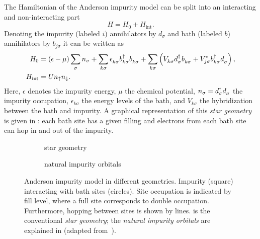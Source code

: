 The Hamiltonian of the Anderson impurity model \cite{Anderson1961} can be split into
an interacting and non-interacting part
\begin{equation}
    H = H_0 + H_\mathrm{int}.
    \label{eq:impurity-Hamiltonian}
\end{equation}
Denoting the impurity (labeled $i$) annihilators by $d_\sigma$
and bath (labeled $b$) annihilators by $b_{j\sigma}$
it can be written as
\begin{align}
    H_0
     & =
    (\epsilon - \mu) \sum_{\pk\sigma} n_\sigma
    +
    \sum_{k\sigma} \epsilon_{k\sigma}^{\pdag} b^\dag_{k\sigma} b^{\pdag}_{k\sigma}
    +
    \sum_{k\sigma} \left(V^{\ps}_{k\sigma} d^\dag_{\pk\sigma} b^{\pdag}_{k\sigma}
    + V_{j\sigma}^* b^\dag_{k\sigma} d^{\pdag}_{\pk\sigma} \right),
    \\
    H_\mathrm{int}
     & =
    U n_\uparrow n_\downarrow.
    \label{eq:anderson-interaction}
\end{align}
Here,
$\epsilon$ denotes the impurity energy,
$\mu$ the chemical potential,
$n_\sigma = d^\dag_\sigma d^{\pdag}_\sigma$ the impurity occupation,
$\epsilon_{k\sigma}$ the energy levels of the bath,
and $V_{k\sigma}$ the hybridization between the bath and impurity.
A graphical representation of this \emph{star geometry} is given in :
each bath site has a given filling
and electrons from each bath site can hop in and out of the impurity.

\begin{figure}[ht]
    \centering
    \savebox{\imagebox}{} %
    \begin{subfigure}{0.45\textwidth}
        \centering
        \usebox{\imagebox}
        \caption{star geometry}
        \label{subfig:geometry-star}
    \end{subfigure}
    \begin{subfigure}{0.45\textwidth}
        \centering
        \raisebox{\dimexpr0.5\ht\imagebox-0.5\height}
        {
            
        }
        \caption{natural impurity orbitals}
        \label{subfig:geometry-natural-impurity-orbitals}
    \end{subfigure}
    \caption{
        Anderson impurity model in different geometries.
        Impurity (square) interacting with bath sites (circles).
        Site occupation is indicated by fill level,
        where a full site corresponds to double occupation.
        Furthermore, hopping between sites is shown by lines.
         is the conventional \emph{star geometry};
         the \emph{natural impurity orbitals}
        are explained in 
        (adapted from~\cite{Lu2019}).
    }
\end{figure}

